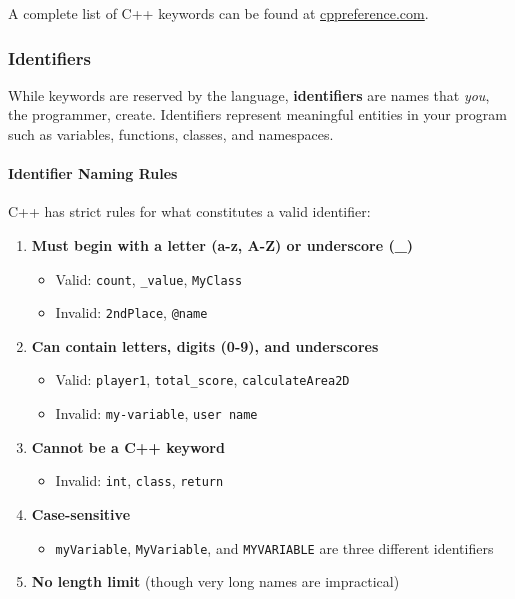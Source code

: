 A complete list of C++ keywords can be found at \href{https://en.cppreference.com/w/cpp/keyword}{cppreference.com}.

\subsubsection{Identifiers}

While keywords are reserved by the language, \textbf{identifiers} are names that \textit{you}, the programmer, create. Identifiers represent meaningful entities in your program such as variables, functions, classes, and namespaces.

\paragraph{Identifier Naming Rules}

C++ has strict rules for what constitutes a valid identifier:

\begin{enumerate}
	\item \textbf{Must begin with a letter (a-z, A-Z) or underscore (\_)}
	\begin{itemize}
		\item Valid: \texttt{count}, \texttt{\_value}, \texttt{MyClass}
		\item Invalid: \texttt{2ndPlace}, \texttt{@name}
	\end{itemize}
	
	\item \textbf{Can contain letters, digits (0-9), and underscores}
	\begin{itemize}
		\item Valid: \texttt{player1}, \texttt{total\_score}, \texttt{calculateArea2D}
		\item Invalid: \texttt{my-variable}, \texttt{user name}
	\end{itemize}
	
	\item \textbf{Cannot be a C++ keyword}
	\begin{itemize}
		\item Invalid: \texttt{int}, \texttt{class}, \texttt{return}
	\end{itemize}
	
	\item \textbf{Case-sensitive}
	\begin{itemize}
		\item \texttt{myVariable}, \texttt{MyVariable}, and \texttt{MYVARIABLE} are three different identifiers
	\end{itemize}
	
	\item \textbf{No length limit} (though very long names are impractical)
\end{enumerate}

